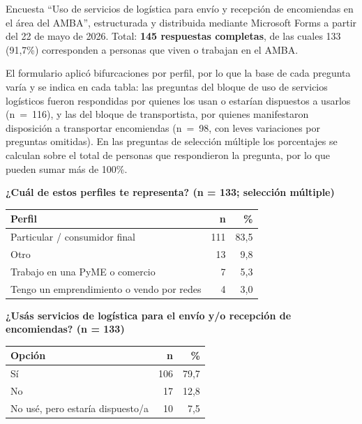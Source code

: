 \label{anexo:encuesta}

Encuesta ``Uso de servicios de logística para envío y recepción de encomiendas en el área del AMBA'', estructurada y distribuida mediante Microsoft Forms a partir del 22 de mayo de 2026. Total: \textbf{145 respuestas completas}, de las cuales 133 (91,7\%) corresponden a personas que viven o trabajan en el AMBA.

El formulario aplicó bifurcaciones por perfil, por lo que la base de cada pregunta varía y se indica en cada tabla: las preguntas del bloque de uso de servicios logísticos fueron respondidas por quienes los usan o estarían dispuestos a usarlos (n~=~116), y las del bloque de transportista, por quienes manifestaron disposición a transportar encomiendas (n~=~98, con leves variaciones por preguntas omitidas). En las preguntas de selección múltiple los porcentajes se calculan sobre el total de personas que respondieron la pregunta, por lo que pueden sumar más de 100\%.

\bigskip
\noindent\textbf{¿Cuál de estos perfiles te representa? (n = 133; selección múltiple)}

\begin{center}
\begin{tabular}{lrr}
	\toprule
	\textbf{Perfil} & \textbf{n} & \textbf{\%} \\
	\midrule
	Particular / consumidor final              & 111 & 83,5 \\
	Otro                                       &  13 &  9,8 \\
	Trabajo en una PyME o comercio             &   7 &  5,3 \\
	Tengo un emprendimiento o vendo por redes  &   4 &  3,0 \\
	\bottomrule
\end{tabular}
\end{center}

\bigskip
\noindent\textbf{¿Usás servicios de logística para el envío y/o recepción de encomiendas? (n = 133)}

\begin{center}
\begin{tabular}{lrr}
	\toprule
	\textbf{Opción} & \textbf{n} & \textbf{\%} \\
	\midrule
	Sí                                 & 106 & 79,7 \\
	No                                 &  17 & 12,8 \\
	No usé, pero estaría dispuesto/a   &  10 &  7,5 \\
	\bottomrule
\end{tabular}
\end{center}

